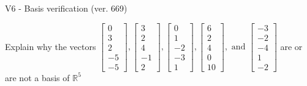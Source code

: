 \begin{exercise}
  \begin{exerciseTitle}V6 - Basis verification (ver. 669)\end{exerciseTitle}
  \begin{exerciseStatement}
    Explain why the vectors \(\left[\begin{array}{r}
0 \\
3 \\
2 \\
-5 \\
-5
\end{array}\right] , \left[\begin{array}{r}
3 \\
2 \\
4 \\
-1 \\
2
\end{array}\right] , \left[\begin{array}{r}
0 \\
1 \\
-2 \\
-3 \\
1
\end{array}\right] , \left[\begin{array}{r}
6 \\
2 \\
4 \\
0 \\
10
\end{array}\right] , \text{ and } \left[\begin{array}{r}
-3 \\
-2 \\
-4 \\
1 \\
-2
\end{array}\right]\) are or are not a basis of \(\mathbb{R}^5\)	



\end{exerciseStatement}
\end{exercise}
